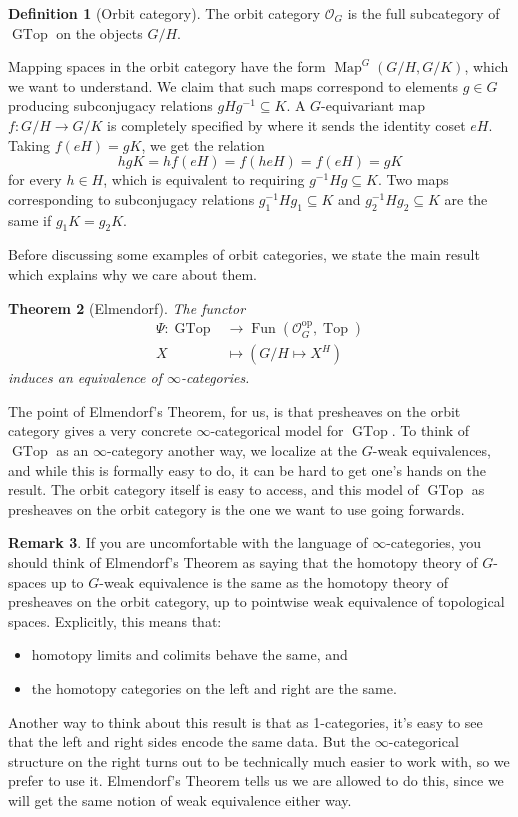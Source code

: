 \documentclass{amsart}
\newtheorem{thm}{Theorem}[section]
\theoremstyle{definition}
\newtheorem{defn}[thm]{Definition}
\newtheorem{remark}[thm]{Remark}
\numberwithin{thm}{section}
\def\O{\mathscr{O}}
\def\Map{\operatorname{Map}}
\def\op{\operatorname{op}}
\def\GTop{\operatorname{GTop}}
\def\Top{\operatorname{Top}}
\def\Fun{\operatorname{Fun}}
\begin{document}
\begin{defn}[Orbit category]
    The orbit category $\O_G$ is the full subcategory of $\GTop$ on the objects $G/H$.
\end{defn}

Mapping spaces in the orbit category have the form $\Map^G(G/H, G/K)$, which we want to understand. We claim that such maps correspond to elements $g \in G$ producing subconjugacy relations $gHg^{-1} \subseteq K$. A $G$-equivariant map $f: G/H \to G/K$ is completely specified by where it sends the identity coset $eH$. Taking $f(eH) = gK$, we get the relation 
\[hgK = hf(eH) = f(heH) = f(eH) = gK\]
for every $h \in H$, which is equivalent to requiring $g^{-1}Hg \subseteq K$. Two maps corresponding to subconjugacy relations $g_1^{-1}Hg_1 \subseteq K$ and $g_2^{-1}Hg_2 \subseteq K$ are the same if $g_1K = g_2K$.

Before discussing some examples of orbit categories, we state the main result which explains why we care about them. 

\begin{thm}[Elmendorf]\label{thm: Elmendorf}
    The functor 
    \begin{align*} \Psi: \GTop &\to \Fun(\O_G^{\op}, \Top)\\
            X &\mapsto (G/H \mapsto X^H) 
    \end{align*}
    induces an equivalence of $\infty$-categories. 
\end{thm}

The point of Elmendorf's Theorem, for us, is that presheaves on the orbit category gives a very concrete $\infty$-categorical model for $\GTop$. To think of $\GTop$ as an $\infty$-category another way, we localize at the $G$-weak equivalences, and while this is formally easy to do, it can be hard to get one's hands on the result. The orbit category itself is easy to access, and this model of $\GTop$ as presheaves on the orbit category is the one we want to use going forwards. 

\begin{remark}
    If you are uncomfortable with the language of $\infty$-categories, you should think of Elmendorf's Theorem as saying that the homotopy theory of $G$-spaces up to $G$-weak equivalence is the same as the homotopy theory of presheaves on the orbit category, up to pointwise weak equivalence of topological spaces. Explicitly, this means that:
    \begin{itemize}
        \item homotopy limits and colimits behave the same, and
        \item the homotopy categories on the left and right are the same.
    \end{itemize}
    Another way to think about this result is that as 1-categories, it's easy to see that the left and right sides encode the same data. But the $\infty$-categorical structure on the right turns out to be technically much easier to work with, so we prefer to use it. Elmendorf's Theorem tells us we are allowed to do this, since we will get the same notion of weak equivalence either way.
\end{remark}
\end{document}
